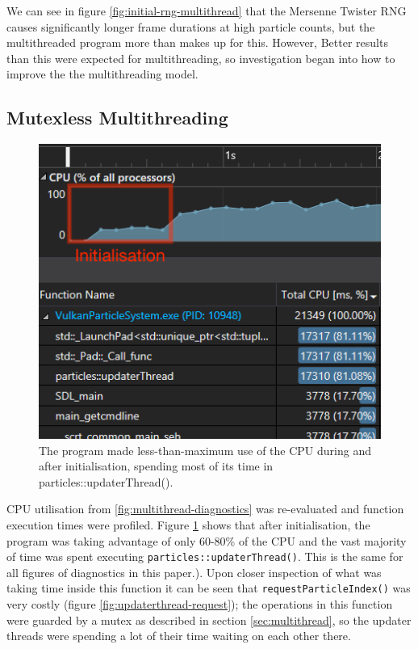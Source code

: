 \documentclass[11pt, a4paper, twocolumn]{article}
\begin{document}
We can see in figure \ref{fig:initial-rng-multithread} that the Mersenne Twister RNG causes significantly longer frame durations at high particle counts, but the multithreaded program more than makes up for this. However, Better results than this were expected for multithreading, so investigation began into how to improve the the multithreading model.

\subsection{Mutexless Multithreading}

\begin{figure}[h]
\includegraphics[width=\linewidth]{rng-mutex-diag}
\caption{The program made less-than-maximum use of the CPU during and after initialisation, spending most of its time in particles::updaterThread().}
\label{fig:rng-mutex-diag}
\end{figure}

CPU utilisation from \ref{fig:multithread-diagnostics} was re-evaluated and function execution times were profiled. Figure \ref{fig:rng-mutex-diag} shows that after initialisation, the program was taking advantage of only 60-80\% of the CPU and the vast majority of time was spent executing \verb|particles::updaterThread()|. This is the same for all figures of diagnostics in this paper.). Upon closer inspection of what was taking time inside this function it can be seen that \verb|requestParticleIndex()| was very costly (figure \ref{fig:updaterthread-request}); the operations in this function were guarded by a mutex as described in section \ref{sec:multithread}, so the updater threads were spending a lot of their time waiting on each other there.
\end{document}
